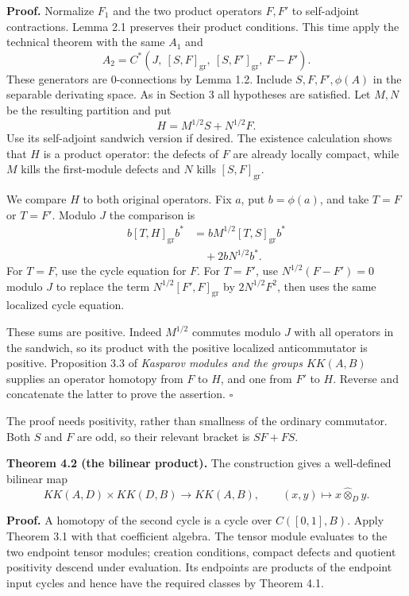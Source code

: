 \documentclass[
  11pt,
]{article}
\begin{document}
\textbf{Proof.} Normalize \(F_1\) and the two product operators \(F,F'\)
to self-adjoint contractions. Lemma 2.1 preserves their product
conditions. This time apply the technical theorem with the same \(A_1\)
and \[
A_2=C^*(J,\ [S,F]_{\mathrm{gr}},\
[S,F']_{\mathrm{gr}},\ F-F').
\tag{4.1}
\] These generators are \(0\)-connections by Lemma 1.2. Include
\(S,F,F',\phi(A)\) in the separable derivating space. As in Section 3
all hypotheses are satisfied. Let \(M,N\) be the resulting partition and
put \[
H=M^{1/2}S+N^{1/2}F.
\tag{4.2}
\] Use its self-adjoint sandwich version if desired. The existence
calculation shows that \(H\) is a product operator: the defects of \(F\)
are already locally compact, while \(M\) kills the first-module defects
and \(N\) kills \([S,F]_{\mathrm{gr}}\).

We compare \(H\) to both original operators. Fix \(a\), put
\(b=\phi(a)\), and take \(T=F\) or \(T=F'\). Modulo \(J\) the comparison
is \[
\begin{aligned}
b[T,H]_{\mathrm{gr}}b^*
&=bM^{1/2}[T,S]_{\mathrm{gr}}b^*\\
&\quad+2bN^{1/2}b^*.
\end{aligned}
\tag{4.3}
\] For \(T=F\), use the cycle equation for \(F\). For \(T=F'\), use
\(N^{1/2}(F-F')=0\) modulo \(J\) to replace the term
\(N^{1/2}[F',F]_{\mathrm{gr}}\) by \(2N^{1/2}F^2\), then uses the same
localized cycle equation.

These sums are positive. Indeed \(M^{1/2}\) commutes modulo \(J\) with
all operators in the sandwich, so its product with the positive
localized anticommutator is positive. Proposition 3.3 of \emph{Kasparov
modules and the groups \(KK(A,B)\)} supplies an operator homotopy from
\(F\) to \(H\), and one from \(F'\) to \(H\). Reverse and concatenate
the latter to prove the assertion. \(\square\)

The proof needs positivity, rather than smallness of the ordinary
commutator. Both \(S\) and \(F\) are odd, so their relevant bracket is
\(SF+FS\).

\textbf{Theorem 4.2 (the bilinear product).} The construction gives a
well-defined bilinear map \[
KK(A,D)\times KK(D,B)\longrightarrow KK(A,B),\qquad
(x,y)\longmapsto x\widehat\otimes_D y.
\tag{4.4}
\]

\textbf{Proof.} A homotopy of the second cycle is a cycle over
\(C([0,1],B)\). Apply Theorem 3.1 with that coefficient algebra. The
tensor module evaluates to the two endpoint tensor modules; creation
conditions, compact defects and quotient positivity descend under
evaluation. Its endpoints are products of the endpoint input cycles and
hence have the required classes by Theorem 4.1.
\end{document}
